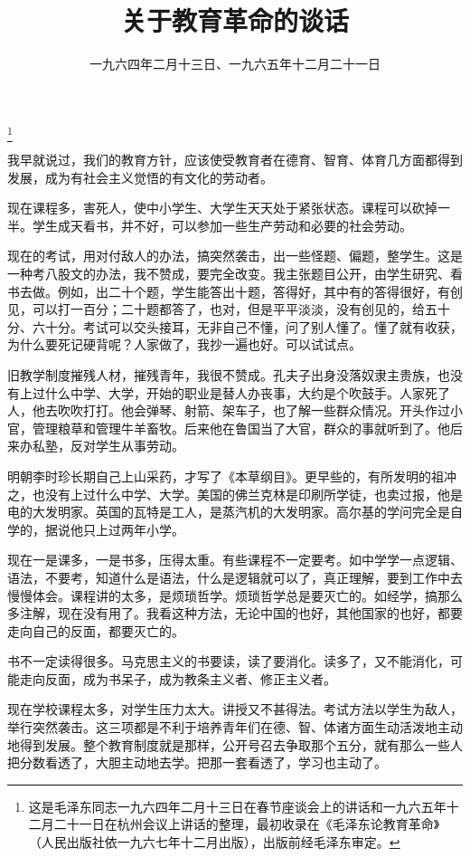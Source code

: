 
\title{关于教育革命的谈话}
\date{一九六四年二月十三日、一九六五年十二月二十一日}
\thanks{这是毛泽东同志一九六四年二月十三日在春节座谈会上的讲话和一九六五年十二月二十一日在杭州会议上讲话的整理，最初收录在《毛泽东论教育革命》（人民出版社依一九六七年十二月出版），出版前经毛泽东审定。}
\maketitle


我早就说过，我们的教育方针，应该使受教育者在德育、智育、体育几方面都得到发展，成为有社会主义觉悟的有文化的劳动者。

现在课程多，害死人，使中小学生、大学生天天处于紧张状态。课程可以砍掉一半。学生成天看书，并不好，可以参加一些生产劳动和必要的社会劳动。

现在的考试，用对付敌人的办法，搞突然袭击，出一些怪题、偏题，整学生。这是一种考八股文的办法，我不赞成，要完全改变。我主张题目公开，由学生研究、看书去做。例如，出二十个题，学生能答出十题，答得好，其中有的答得很好，有创见，可以打一百分；二十题都答了，也对，但是平平淡淡，没有创见的，给五十分、六十分。考试可以交头接耳，无非自己不懂，问了别人懂了。懂了就有收获，为什么要死记硬背呢？人家做了，我抄一遍也好。可以试试点。

旧教学制度摧残人材，摧残青年，我很不赞成。孔夫子出身没落奴隶主贵族，也没有上过什么中学、大学，开始的职业是替人办丧事，大约是个吹鼓手。人家死了人，他去吹吹打打。他会弹琴、射箭、架车子，也了解一些群众情况。开头作过小官，管理粮草和管理牛羊畜牧。后来他在鲁国当了大官，群众的事就听到了。他后来办私塾，反对学生从事劳动。

明朝李时珍长期自己上山采药，才写了《本草纲目》。更早些的，有所发明的祖冲之，也没有上过什么中学、大学。美国的佛兰克林是印刷所学徒，也卖过报，他是电的大发明家。英国的瓦特是工人，是蒸汽机的大发明家。高尔基的学问完全是自学的，据说他只上过两年小学。

现在一是课多，一是书多，压得太重。有些课程不一定要考。如中学学一点逻辑、语法，不要考，知道什么是语法，什么是逻辑就可以了，真正理解，要到工作中去慢慢体会。课程讲的太多，是烦琐哲学。烦琐哲学总是要灭亡的。如经学，搞那么多注解，现在没有用了。我看这种方法，无论中国的也好，其他国家的也好，都要走向自己的反面，都要灭亡的。

书不一定读得很多。马克思主义的书要读，读了要消化。读多了，又不能消化，可能走向反面，成为书呆子，成为教条主义者、修正主义者。

现在学校课程太多，对学生压力太大。讲授又不甚得法。考试方法以学生为敌人，举行突然袭击。这三项都是不利于培养青年们在德、智、体诸方面生动活泼地主动地得到发展。整个教育制度就是那样，公开号召去争取那个五分，就有那么一些人把分数看透了，大胆主动地去学。把那一套看透了，学习也主动了。

